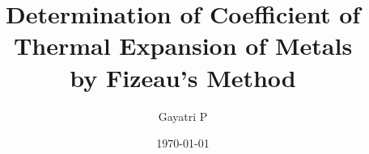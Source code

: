 \documentclass[reprint,amsmath,amssymb,aps]{revtex4-2}
\begin{document}
    \title{Determination of Coefficient of Thermal Expansion of Metals\\by Fizeau’s Method}

    \author{Gayatri P}
    \date{\today}

    
    \maketitle


    
    
    
    
    
     
    
    \nocite{*}
\end{document}
